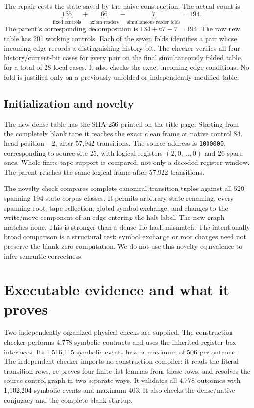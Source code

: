 \documentclass[11pt,a4paper]{article}
\theoremstyle{definition}
\begin{document}
The repair costs the state saved by the naive construction. The actual
count is
\[
  \underbrace{135}_{\text{fixed controls}}+
  \underbrace{66}_{\text{axiom readers}}-
  \underbrace{7}_{\text{simultaneous reader folds}}=194.
\]
The parent's corresponding decomposition is $134+67-7=194$. The raw
new table has 201 working controls. Each of the seven folds identifies
a pair whose incoming edge records a distinguishing history bit. The
checker verifies all four history/current-bit cases for every pair on
the final simultaneously folded table, for a total of 28 local cases.
It also checks the exact incoming-edge conditions. No fold is justified
only on a previously unfolded or independently modified table.

\subsection{Initialization and novelty}
The new dense table has the SHA-256 printed on the title page. Starting
from the completely blank tape it reaches the exact clean frame at
native control 84, head position $-2$, after 57,942 transitions. The
source address is \texttt{1000000}, corresponding to source site 25,
with logical registers $(2,0,\ldots,0)$ and 26 spare ones. Whole finite
tape support is compared, not only a decoded register window. The
parent reaches the same logical frame after 57,922 transitions.

The novelty check compares complete canonical transition tuples against
all 520 spanning 194-state corpus classes. It permits arbitrary state
renaming, every spanning root, tape reflection, global symbol exchange,
and changes to the write/move component of an edge entering the halt
label. The new graph matches none. This is stronger than a dense-file
hash mismatch. The intentionally broad comparison is a structural test:
symbol exchange or root changes need not preserve the blank-zero
computation. We do not use this novelty equivalence to infer semantic
correctness.

\section{Executable evidence and what it proves}

Two independently organized physical checks are supplied. The
construction checker performs 4,778 symbolic contracts and uses the
inherited register-box interfaces. Its 1,516,115 symbolic events have a
maximum of 506 per outcome. The independent checker imports no
construction compiler; it reads the literal transition rows, re-proves
four finite-list lemmas from those rows, and resolves the source
control graph in two separate ways. It validates all 4,778 outcomes
with 1,102,204 symbolic events and maximum 403. It also checks the
dense/native conjugacy and the complete blank startup.
\end{document}
